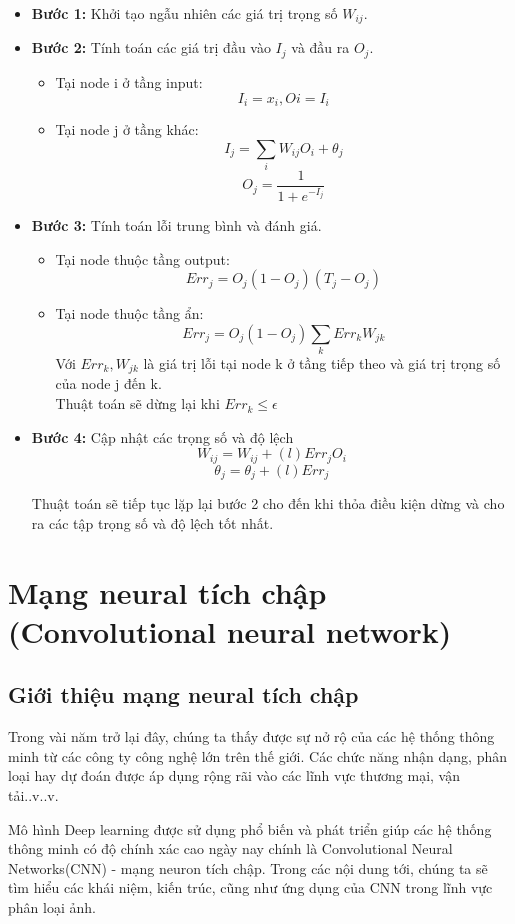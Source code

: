 		\begin{itemize}
			\item \textbf{Bước 1:} Khởi tạo ngẫu nhiên các giá trị trọng số  \(W_{ij}\).
			\item \textbf{Bước 2:} Tính toán các giá trị đầu vào \(I_{j}\) và đầu ra \(O_{j}\).
			\begin{itemize}
				\item Tại node i ở tầng input:
				\[I_{i} = x_{i}, O{i} = I_{i}\]
				\item Tại node j ở tầng khác:
				\[ I_{j} = \sum_{i} W_{ij}O_{i} + \theta_{j} \]
				\[O_{j} = \frac{1}{1 + e^{-I_{j}}}\]
			\end{itemize}
			\item \textbf{Bước 3:} Tính toán lỗi trung bình và đánh giá.
				\begin{itemize}
					\item Tại node thuộc tầng output:
					\[Err_{j} = O_{j}(1-O_{j})(T_{j} - O_{j})\]
					\item Tại node thuộc tầng ẩn:
					\[Err_{j} = O_{j}(1-O_{j})\sum_{k}Err_{k}W_{jk}\]
					Với \(Err_{k}, W_{jk}\) là giá trị lỗi tại node k ở tầng tiếp theo và giá trị trọng số của node j đến k.\\
					Thuật toán sẽ dừng lại khi \(Err_{k} \leq \epsilon\)
					
				\end{itemize}
			\item \textbf{Bước 4:} Cập nhật các trọng số và độ lệch
			\[W_{ij} = W_{ij} + (l)Err_{j}O_{i}\]
			\[\theta_{j} = \theta_{j} + (l)Err_{j}\]
			
			Thuật toán sẽ tiếp tục lặp lại bước 2 cho đến khi thỏa điều kiện dừng và cho ra các tập trọng số và độ lệch tốt nhất.
		\end{itemize}
		
		
		
		
			
			

\section{Mạng neural tích chập (Convolutional neural network)}

\subsection{Giới thiệu mạng neural tích chập}
	Trong vài năm trở lại đây, chúng ta thấy được sự nở rộ của các hệ thống thông minh từ các công ty công nghệ lớn trên thế giới. Các chức năng nhận dạng, phân loại hay dự đoán được áp dụng rộng rãi vào các lĩnh vực thương mại, vận tải..v..v.\par
	Mô hình Deep learning được sử dụng phổ biến và phát triển giúp các hệ thống thông minh có độ chính xác cao ngày nay chính là Convolutional Neural Networks(CNN) - mạng neuron tích chập. Trong các nội dung tới, chúng ta sẽ tìm hiểu các khái niệm, kiến trúc, cũng như ứng dụng của CNN trong lĩnh vực phân loại ảnh.

